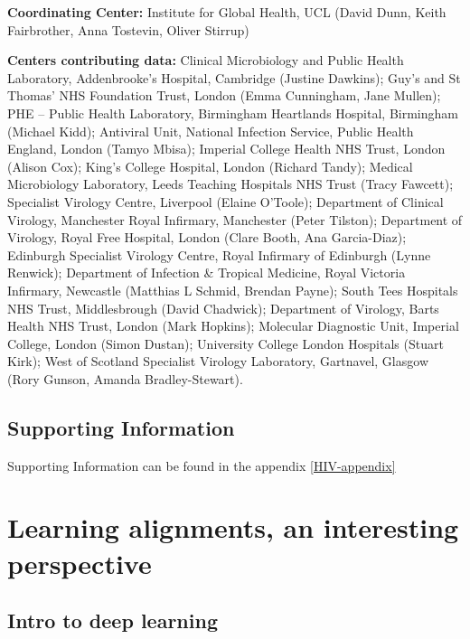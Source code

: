 \documentclass[
  11pt,
  twoside,
  BCOR=10mm,
  listof=totoc]{scrbook}
\begin{document}
\textbf{Coordinating Center:}
Institute for Global Health, UCL (David Dunn, Keith Fairbrother,
Anna Tostevin, Oliver Stirrup)

\textbf{Centers contributing data:}
Clinical Microbiology and Public Health Laboratory, Addenbrooke's
Hospital, Cambridge (Justine Dawkins); Guy's and St Thomas' NHS
Foundation Trust, London (Emma Cunningham, Jane Mullen); PHE --
Public Health Laboratory, Birmingham Heartlands Hospital, Birmingham
(Michael Kidd); Antiviral Unit, National Infection Service, Public
Health England, London (Tamyo Mbisa); Imperial College Health NHS
Trust, London (Alison Cox); King's College Hospital, London (Richard
Tandy); Medical Microbiology Laboratory, Leeds Teaching Hospitals
NHS Trust (Tracy Fawcett); Specialist Virology Centre, Liverpool
(Elaine O'Toole); Department of Clinical Virology, Manchester Royal
Infirmary, Manchester (Peter Tilston); Department of Virology, Royal
Free Hospital, London (Clare Booth, Ana Garcia-Diaz); Edinburgh
Specialist Virology Centre, Royal Infirmary of Edinburgh (Lynne
Renwick); Department of Infection \& Tropical Medicine, Royal
Victoria Infirmary, Newcastle (Matthias L Schmid, Brendan Payne);
South Tees Hospitals NHS Trust, Middlesbrough (David Chadwick);
Department of Virology, Barts Health NHS Trust, London (Mark
Hopkins); Molecular Diagnostic Unit, Imperial College, London (Simon
Dustan); University College London Hospitals (Stuart Kirk); West of
Scotland Specialist Virology Laboratory, Gartnavel, Glasgow (Rory
Gunson, Amanda Bradley-Stewart).

\hypertarget{supporting-information}{%
\section*{Supporting Information}\label{supporting-information}}

Supporting Information can be found in the appendix \ref{HIV-appendix}


\hypertarget{learning-alignments-an-interesting-perspective}{%
\chapter{Learning alignments, an interesting perspective}\label{learning-alignments-an-interesting-perspective}}

\hypertarget{intro-to-deep-learning}{%
\section{Intro to deep learning}\label{intro-to-deep-learning}}
\end{document}
